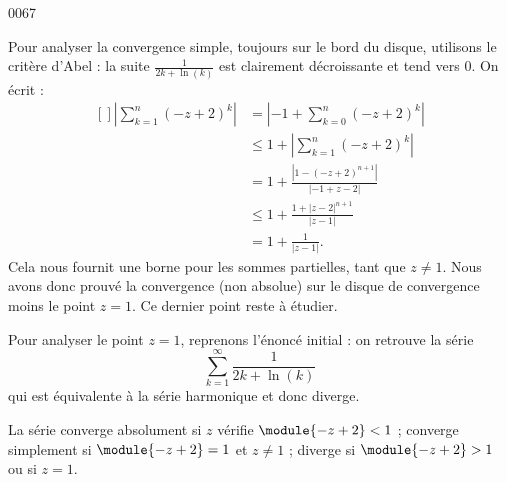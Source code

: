 \begin{corrige}{0067}
\begin{enumerate}
Pour analyser la convergence simple, toujours sur le bord du disque, utilisons le critère d'Abel : la suite $\frac{1}{2k+\ln(k)}$ est clairement décroissante et tend vers $0$. On écrit :
\begin{equation}
	\begin{aligned}[]
		\left| \sum_{k=1}^n(-z+2)^k \right| &=\left| -1+\sum_{k=0}^n(-z+2)^k \right| \\
			&\leq 1+\left| \sum_{k=1}^n(-z+2)^k \right| \\
			&=1+\frac{ | 1-(-z+2)^{n+1} | }{ |-1+z-2| }\\
			&\leq 1+\frac{ 1+| z-2 |^{n+1} }{ | z-1 | }\\
			&=1+\frac{1}{ | z-1 | }.
	\end{aligned}
\end{equation}
Cela nous fournit une borne pour les sommes partielles, tant que $z\neq 1$. Nous avons donc prouvé la convergence (non absolue) sur le disque de convergence moins le point $z=1$. Ce dernier point reste à étudier.

Pour analyser le point $z = 1$, reprenons l'énoncé initial : on retrouve la série
\begin{equation*}
\sum_{k=1}^\infty \frac{1}{2k + \ln(k)}    
\end{equation*}
qui est équivalente à la série harmonique et donc diverge.

\conclusion La série converge absolument si $z$ vérifie $\module{-z
+2}<1$ ; converge simplement si $\module{-z+2} = 1$ et $z \neq 1$
; diverge si $\module{-z+2}>1$ ou si $z = 1$.
\end{enumerate}


\end{corrige}
